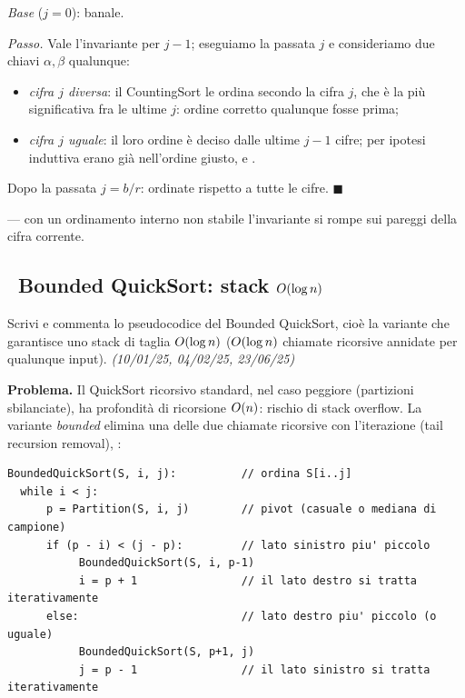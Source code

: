\emph{Base} ($j=0$): banale.

\emph{Passo.} Vale l'invariante per $j-1$; eseguiamo la passata $j$ e consideriamo due chiavi
$\alpha,\beta$ qualunque:
\begin{itemize}[leftmargin=1.6em,itemsep=1pt]
\item \emph{cifra $j$ diversa}: il CountingSort le ordina secondo la cifra $j$, che \`e la pi\`u
significativa fra le ultime $j$: ordine corretto qualunque fosse prima;
\item \emph{cifra $j$ uguale}: il loro ordine \`e deciso dalle ultime $j-1$ cifre; per ipotesi
induttiva erano gi\`a nell'ordine giusto, e .
\end{itemize}
Dopo la passata $j=b/r$: ordinate rispetto a tutte le cifre. $\blacksquare$

 --- con un ordinamento interno non stabile l'invariante si
rompe sui pareggi della cifra corrente.

\subsection*{\hot\ Bounded QuickSort: stack $O\!\left(\log n\right)$}

\begin{domanda}
Scrivi e commenta lo pseudocodice del Bounded QuickSort, cio\`e la variante che garantisce uno
stack di taglia $O\!\left(\log n\right)$ ($O\!\left(\log n\right)$ chiamate ricorsive annidate per qualunque input).
\emph{(10/01/25, 04/02/25, 23/06/25)}
\end{domanda}

\textbf{Problema.} Il QuickSort ricorsivo standard, nel caso peggiore (partizioni sbilanciate), ha
profondit\`a di ricorsione $O\!\left(n\right)$: rischio di stack overflow. La variante \emph{bounded} elimina
una delle due chiamate ricorsive con l'iterazione (tail recursion removal), :

\begin{verbatim}
BoundedQuickSort(S, i, j):          // ordina S[i..j]
  while i < j:
      p = Partition(S, i, j)        // pivot (casuale o mediana di campione)
      if (p - i) < (j - p):         // lato sinistro piu' piccolo
           BoundedQuickSort(S, i, p-1)
           i = p + 1                // il lato destro si tratta iterativamente
      else:                         // lato destro piu' piccolo (o uguale)
           BoundedQuickSort(S, p+1, j)
           j = p - 1                // il lato sinistro si tratta iterativamente
\end{verbatim}

